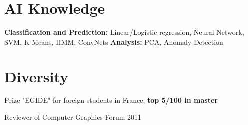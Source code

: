 \documentclass{tccv}
\begin{document}
\section{AI Knowledge}
\textbf{Classification and Prediction:} Linear/Logistic regression, Neural Network, SVM, K-Means, HMM, ConvNets
\textbf{Analysis:} PCA, Anomaly Detection


\section{Diversity}
\begin{factlist}
\item{}{Prize "EGIDE" for foreign students in France, \textbf{top 5/100 in master}}
\item{}{Reviewer of Computer Graphics Forum 2011}
\end{factlist}
\end{document}
